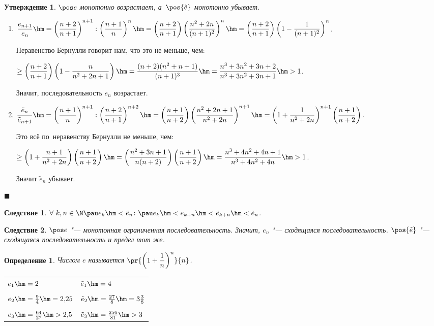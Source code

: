 \documentclass[a4paper,10pt,twoside]{article}
\newtheorem{Def}{Определение}[section]
\newtheorem{Sl}{Следствие}[section]
\newtheorem{Ut}{Утверждение}[section]
\newenvironment{Proof}
       {\par\noindent{\textbf{Доказательство.}}}
       {\hfill$\scriptstyle\blacksquare$}
\begin{document}
\begin{Ut}
$\pos e$ монотонно возрастает, а~$\pos{\tilde e}$ монотонно убывает.
\end{Ut}
\begin{Proof}
\begin{enumerate}
\item $\dfrac{e_{n+1}}{e_n}\hm=
\left(\dfrac{n+2}{n+1}\right)^{n+1}:\left(\dfrac{n+1}n\right)^n\hm=
\left(\dfrac{n+2}{n+1}\right)\left(\dfrac{n^2+2n}{(n+1)^2}\right)^n\hm=
\left(\dfrac{n+2}{n+1}\right)\left(1-\dfrac1{(n+1)^2}\right)^n$.

Неравенство Бернулли говорит нам, что это не меньше, чем:

$\geq \left(\dfrac{n+2}{n+1}\right)\left(1-\dfrac{n}{n^2+2n+1}\right)\hm=
\dfrac{(n+2)(n^2+n+1)}{(n+1)^3}\hm=\dfrac{n^3+3n^2+3n+2}{n^3+3n^2+3n+1}\hm>1$.

Значит, последовательность $e_n$ возрастает.

\item $\dfrac{\tilde e_n}{\tilde e_{n+1}}\hm=
\left(\dfrac{n+1}{n}\right)^{n+1}:\left(\dfrac{n+2}{n+1}\right)^{n+2}\hm=
\left(\dfrac{n+1}{n+2}\right)
\left(\dfrac{n^2+2n+1}{n^2+2n}\right)^{n+1}\hm=
\left(1+\dfrac{1}{n^2+2n}\right)^{n+1}\left(\dfrac{n+1}{n+2}\right)$.

Это всё по~неравенству Бернулли не меньше, чем:

$\geq\left(1+\dfrac{n+1}{n^2+2n}\right)\left(\dfrac{n+1}{n+2}\right)\hm=
\left(\dfrac{n^2+3n+1}{n(n+2)}\right)\left(\dfrac{n+1}{n+2}\right)\hm=
\dfrac{n^3+4n^2+4n+1}{n^3+4n^2+4n}\hm>1$.

Значит $\tilde e_n$ убывает.
\end{enumerate}
\end{Proof}
\begin{Sl}
$\forall\  k,n\in\N\pau e_k\hm<\tilde e_n\colon \pau e_k\hm<e_{k+n}\hm<\tilde e_{k+n}\hm<\tilde e_n$.
\end{Sl}
\begin{Sl}
$\pos e$ "--- монотонная ограниченная последовательность. Значит,
$e_n$ "--- сходящаяся последовательность. $\pos{\tilde e}$ "--- сходящаяся последовательность и предел тот же.
\end{Sl}

\begin{Def}
Числом $e$ называется $\pr{\left(1+\dfrac1n\right)^n}{n}$.
\end{Def}

\begin{tabular}{ll}
$e_1\hm=2$                   &   $\tilde e_1\hm=4$\\ \\
$e_2\hm=\frac94\hm=2{,}25$      &   $\tilde e_2\hm=\frac{27}8\hm=3\frac38$\\ \\
$    e_3\hm=\frac{64}{27}\hm>2{,}5$ &   $\tilde e_3\hm=\frac{256}{81}\hm>3$
\end{tabular}
\end{document}
